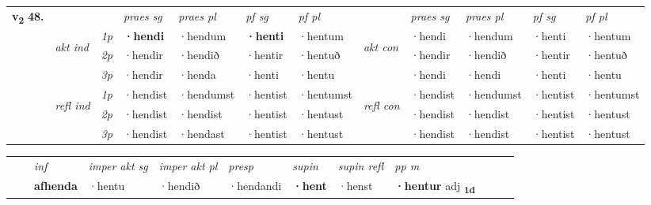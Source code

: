 \begin{tabular}{llllllllllll} \toprule
\multirow{4}{*}{{{\textbf{v{\textsubscript{2}}} \Large{\textbf{48.}}}}}  & &   &  \textit{praes sg}  & \textit{praes pl}  &\textit{ pf sg} & \textit{pf pl} &  &  \textit{praes sg}  & \textit{praes pl}  & \textit{pf sg} & \textit{pf pl } \\*
	\cmidrule{4-7} \cmidrule{9-12}
 & \multirow{3}{*}{\begin{turn}{90}\textit{akt ind}\end{turn}} & {\textit{1p}} & \textbf{·hendi} & ·hendum    & \textbf{·henti} & ·hentum & \multirow{3}{*}{\begin{turn}{90}\textit{akt con}\end{turn}} &·hendi & ·hendum & ·henti & ·hentum\\*
& &  {\textit{2p}} &  ·hendir  & ·hendið   & ·hentir & ·hentuð & & ·hendir & ·hendið & ·hentir & ·hentuð \\*
& &  {\textit{3p}} & ·hendir & ·henda   & ·henti & ·hentu & & ·hendi & ·hendi& ·henti & ·hentu  \\*
\cmidrule{4-7} \cmidrule{9-12}
 &\multirow{3}{*}{\begin{turn}{90}\textit{refl ind}\end{turn}} & {\textit{1p}} & ·hendist & ·hendumst    & ·hentist & ·hentumst & \multirow{3}{*}{\begin{turn}{90}\textit{refl con}\end{turn}}  &·hendist & ·hendumst & ·hentist & ·hentumst\\*
 &&  {\textit{2p}} &  ·hendist  & ·hendist   & ·hentist & ·hentust & &·hendist & ·hendist & ·hentist & ·hentust \\*
& &  {\textit{3p}} & ·hendist & ·hendast   & ·hentist & ·hentust & & ·hendist & ·hendist& ·hentist & ·hentust  \\*
\cmidrule{4-7} \cmidrule{9-12}
\end{tabular}


\begin{tabular}{llllllllllll}
 & & \textit{inf} & \textit{imper akt sg} & \textit{imper akt pl}   & \textit{presp} & \textit{supin} & \textit{supin refl} & \textit{pp m}     \\*
  & & \textbf{afhenda} & ·hentu  & ·hendið   & ·hendandi &  \textbf{·hent} & ·henst & \textbf{·hentur} adj \textbf{\textsubscript{1d}} \\*
\cmidrule{1-12}
\end{tabular}



